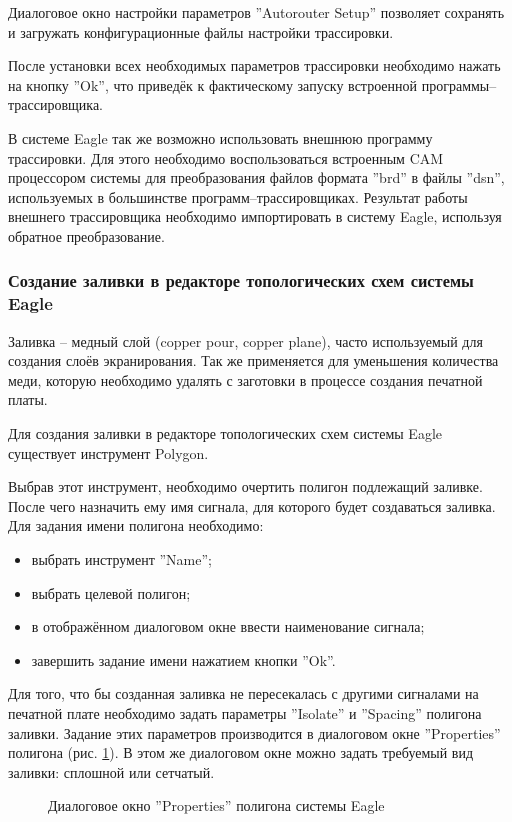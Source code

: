 Диалоговое окно настройки параметров ''Autorouter Setup'' позволяет сохранять и загружать
конфигурационные файлы настройки трассировки.

После установки всех необходимых параметров трассировки необходимо нажать на кнопку
''Ok'', что приведёк к фактическому запуску встроенной программы--трассировщика.

В системе Eagle так же возможно использовать внешнюю программу трассировки.
Для этого необходимо воспользоваться встроенным CAM процессором системы для
преобразования файлов формата ''brd'' в файлы ''dsn'', используемых в большинстве
программ--трассировщиках. Результат работы внешнего трассировщика необходимо
импортировать в систему Eagle, используя обратное преобразование.

\subsubsection{Создание заливки в редакторе топологических схем системы Eagle}
Заливка -- медный слой (copper pour, copper plane), часто используемый для создания
слоёв экранирования. Так же применяется для уменьшения количества меди, которую
необходимо удалять с заготовки в процессе создания печатной платы.

Для создания заливки в редакторе топологических схем системы Eagle существует
инструмент Polygon.

Выбрав этот инструмент, необходимо очертить полигон подлежащий заливке. После чего
назначить ему имя сигнала, для которого будет создаваться заливка. Для задания имени
полигона необходимо:
\begin{itemize}
	\item{} выбрать инструмент ''Name'';
	\item{} выбрать целевой полигон;
	\item{} в отображённом диалоговом окне ввести наименование сигнала;
	\item{} завершить задание имени нажатием кнопки ''Ok''.
\end{itemize}
Для того, что бы созданная заливка не пересекалась с другими сигналами на печатной
плате необходимо задать параметры ''Isolate'' и ''Spacing'' полигона заливки. Задание
этих параметров производится в диалоговом окне ''Properties''
полигона (рис. \ref{img:polyProperty}). В этом же диалоговом окне можно задать требуемый вид
заливки: сплошной или сетчатый.
\begin{figure}[h]
	\caption{Диалоговое окно ''Properties'' полигона системы Eagle}
	\label{img:polyProperty}
\end{figure}
